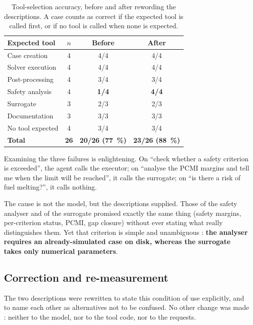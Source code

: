 \begin{table}[htbp]
\centering
\caption[Tool-selection accuracy]{Tool-selection accuracy, before and after
rewording the descriptions. A case counts as correct if the expected tool is
called first, or if no tool is called when none is expected.}
\label{tab:toolsel}
\begin{tabularx}{\textwidth}{@{}Xccc@{}}
\toprule
\textbf{Expected tool} & \textbf{$n$} & \textbf{Before} & \textbf{After}\\
\midrule
Case creation & 4 & 4/4 & 4/4\\
Solver execution & 4 & 4/4 & 4/4\\
Post-processing & 4 & 3/4 & 3/4\\
Safety analysis & 4 & \textcolor{cAlert}{\textbf{1/4}} & \textbf{4/4}\\
Surrogate & 3 & 2/3 & 2/3\\
Documentation & 3 & 3/3 & 3/3\\
No tool expected & 4 & 3/4 & 3/4\\
\midrule
\textbf{Total} & \textbf{26} & \textbf{20/26 (\SI{77}{\percent})} &
  \textbf{23/26 (\SI{88}{\percent})}\\
\bottomrule
\end{tabularx}
\end{table}

Examining the three failures is enlightening. On ``check whether a safety
criterion is exceeded'', the agent calls the executor; on ``analyse the PCMI
margins and tell me when the limit will be reached'', it calls the surrogate; on
``is there a risk of fuel melting?'', it calls nothing.

The cause is not the model, but the descriptions supplied. Those of the safety
analyser and of the surrogate promised exactly the same thing (safety margins,
per-criterion status, PCMI, gap closure) without ever stating what really
distinguishes them. Yet that criterion is simple and unambiguous : \textbf{the
analyser requires an already-simulated case on disk, whereas the surrogate takes
only numerical parameters}.

\subsection{Correction and re-measurement}

The two descriptions were rewritten to state this condition of use explicitly,
and to name each other as alternatives not to be confused. No other change was
made : neither to the model, nor to the tool code, nor to the requests.

